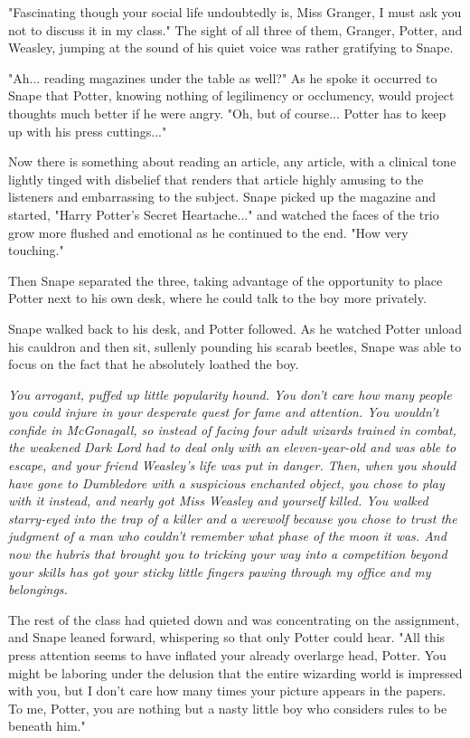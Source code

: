 \documentclass[a4paper,11pt]{article}
\begin{document}
"Fascinating though your social life undoubtedly is, Miss Granger, I must ask you not to discuss it in my class." The sight of all three of them, Granger, Potter, and Weasley, jumping at the sound of his quiet voice was rather gratifying to Snape.

"Ah... reading magazines under the table as well?" As he spoke it occurred to Snape that Potter, knowing nothing of legilimency or occlumency, would project thoughts much better if he were angry. "Oh, but of course... Potter has to keep up with his press cuttings..."

Now there is something about reading an article, any article, with a clinical tone lightly tinged with disbelief that renders that article highly amusing to the listeners and embarrassing to the subject. Snape picked up the magazine and started, "Harry Potter's Secret Heartache..." and watched the faces of the trio grow more flushed and emotional as he continued to the end. "How very touching."

Then Snape separated the three, taking advantage of the opportunity to place Potter next to his own desk, where he could talk to the boy more privately.

Snape walked back to his desk, and Potter followed. As he watched Potter unload his cauldron and then sit, sullenly pounding his scarab beetles, Snape was able to focus on the fact that he absolutely loathed the boy.

\emph{You arrogant, puffed up little popularity hound. You don't care how many people you could injure in your desperate quest for fame and attention. You wouldn't confide in McGonagall, so instead of facing four adult wizards trained in combat, the weakened Dark Lord had to deal only with an eleven-year-old and was able to escape, and your friend Weasley's life was put in danger. Then, when you should have gone to Dumbledore with a suspicious enchanted object, you chose to play with it instead, and nearly got Miss Weasley and yourself killed. You walked starry-eyed into the trap of a killer and a werewolf because you chose to trust the judgment of a man who couldn't remember what phase of the moon it was. And now the hubris that brought you to tricking your way into a competition beyond your skills has got your sticky little fingers pawing through my office and my belongings.}

The rest of the class had quieted down and was concentrating on the assignment, and Snape leaned forward, whispering so that only Potter could hear. "All this press attention seems to have inflated your already overlarge head, Potter. You might be laboring under the delusion that the entire wizarding world is impressed with you, but I don't care how many times your picture appears in the papers. To me, Potter, you are nothing but a nasty little boy who considers rules to be beneath him."
\end{document}
